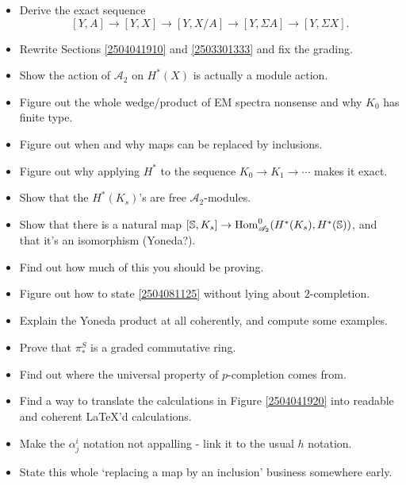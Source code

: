 \documentclass{MetricNotes2023}
\def\bb{\ensuremath\mathbb}
\def\A{\ensuremath{\mathscr{A}_2}}
\DeclareMathOperator{\Hom}{Hom}
\begin{document}
\begin{itemize}
\item Derive the exact sequence
\[[Y,A]\to [Y,X]\to [Y, X/A]\to [Y, \Sigma A]\to [Y, \Sigma X].\]

\item Rewrite Sections \ref{2504041910} and \ref{2503301333} and fix the grading.

\item Show the action of \(\A\) on \(H^*(X)\) is actually a module action.

\item Figure out the whole wedge/product of EM spectra nonsense and why \(K_0\) has finite type. 

\item Figure out when and why maps can be replaced by inclusions.

\item Figure out why applying \(H^*\) to the sequence \(K_0\to K_1 \to \cdots\) makes it exact.

\item Show that the \(H^*(K_s)\)'s are free \(\A\)-modules.

\item Show that there is a natural map \([\bb{S}, K_s]\to \Hom^0_{\A}(H^*(K_s), H^*(\bb{S}))\), and that it's an isomorphism (Yoneda?). 

\item Find out how much of this you should be proving.

\item Figure out how to state \ref{2504081125} without lying about \(2\)-completion.

\item Explain the Yoneda product at all coherently, and compute some examples.

\item Prove that \(\pi_*^S\) is a graded commutative ring.

\item Find out where the universal property of \(p\)-completion comes from. 

\item Find a way to translate the calculations in Figure \ref{2504041920} into readable and coherent LaTeX'd calculations.

\item Make the \(\alpha^i_j\) notation not appalling - link it to the usual \(h\) notation.

\item State this whole `replacing a map by an inclusion' business somewhere early.
\end{itemize}
\end{document}
